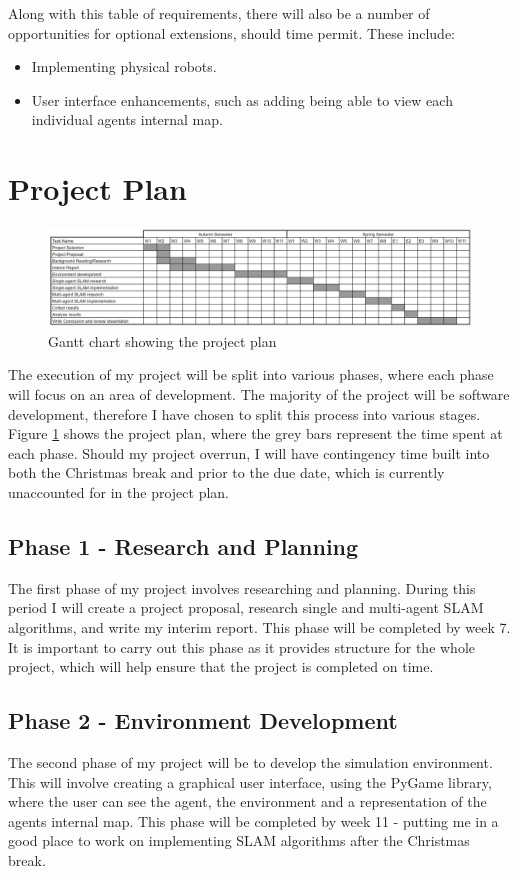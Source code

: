 \documentclass[12pt]{article}
\begin{document}
Along with this table of requirements, there will also be a number of opportunities for optional extensions, should time permit.
These include:
\begin{itemize}
    \item Implementing physical robots.
    \item User interface enhancements, such as adding being able to view each individual agents internal map.
\end{itemize}

\pagebreak

\section{Project Plan}
\begin{figure}[H]
    \centering
    \includegraphics[width=0.8\linewidth]{gantt_chart.png}
    \caption{Gantt chart showing the project plan}
    \label{fig:gantt_chart}
\end{figure}
The execution of my project will be split into various phases, where each phase will focus on an area of development. The
majority of the project will be software development, therefore I have chosen to split this process into various stages. Figure
\ref{fig:gantt_chart} shows the project plan, where the grey bars represent the time spent at each phase. Should my project
overrun, I will have contingency time built into both the Christmas break and prior to the due date, which is currently unaccounted
for in the project plan.\\

\subsection{Phase 1 - Research and Planning}
The first phase of my project involves researching and planning. During this period I will create a project proposal,
research single and multi-agent SLAM algorithms, and write my interim report. This phase will be completed by week 7. It is
important to carry out this phase as it provides structure for the whole project, which will help ensure that the project is
completed on time.

\subsection{Phase 2 - Environment Development}
The second phase of my project will be to develop the simulation environment. This will involve creating a graphical user
interface, using the PyGame library, where the user can see the agent, the environment and a representation of the agents
internal map. This phase will be completed by week 11 - putting me in a good place to work on implementing SLAM algorithms
after the Christmas break.
\end{document}
